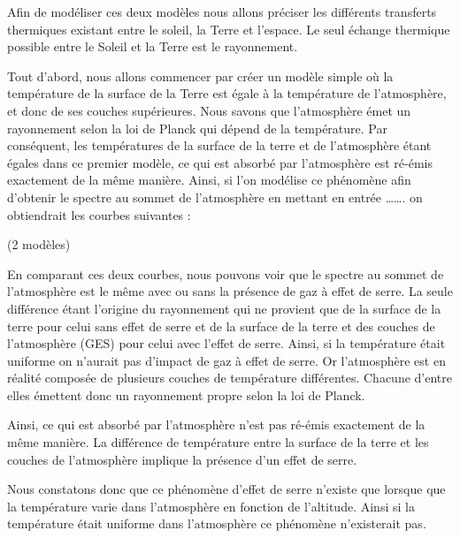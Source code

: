 \documentclass[a4paper, 12pt]{report} %
\begin{document}
Afin de modéliser ces deux modèles nous allons préciser les différents transferts thermiques 
existant entre le soleil, la Terre et l’espace. Le seul échange thermique possible entre le Soleil
 et la Terre est le rayonnement.
\vspace{\baselineskip}

Tout d’abord, nous allons commencer par créer un modèle simple où la température de la surface de 
la Terre est égale à la température de l’atmosphère, et donc de ses couches supérieures. Nous savons 
que l’atmosphère émet un rayonnement selon la loi de Planck qui dépend de la température. Par 
conséquent, les températures de la surface de la terre et de l’atmosphère étant égales dans ce 
premier modèle, ce qui est absorbé par l’atmosphère est ré-émis exactement de la même manière.
Ainsi, si l'on modélise ce phénomène afin d’obtenir le spectre au sommet de l’atmosphère en mettant 
en entrée ……. on obtiendrait les courbes suivantes :
\vspace{\baselineskip}

(2 modèles)
\vspace{\baselineskip}


En comparant ces deux courbes, nous pouvons voir que le spectre au sommet de l’atmosphère est le 
même avec ou sans la présence de gaz à effet de serre. La seule différence étant l’origine du 
rayonnement qui ne provient que de la surface de la terre pour celui sans effet de serre et de la 
surface de la terre et des couches de l'atmosphère (GES) pour celui avec l’effet de serre. 
Ainsi, si la température était uniforme on n’aurait pas d’impact de gaz à effet de serre.
Or l’atmosphère est en réalité composée de plusieurs couches de température différentes. Chacune 
d’entre elles émettent donc un rayonnement propre selon la loi de Planck. 
\vspace{\baselineskip}

Ainsi, ce qui est absorbé par l’atmosphère n’est pas ré-émis exactement de la même manière.
La différence de température entre la surface de la terre et les couches de l’atmosphère implique 
la présence d’un effet de serre.
\vspace{\baselineskip}

Nous constatons donc que ce phénomène d'effet de serre n'existe 
que lorsque que la température varie dans l'atmosphère en 
fonction de l'altitude. Ainsi si la température était uniforme 
dans l'atmosphère ce phénomène n'existerait pas. \vspace{\baselineskip}
\end{document}
